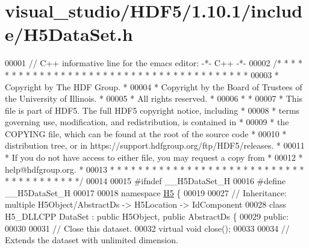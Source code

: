\hypertarget{visual__studio_2_h_d_f5_21_810_81_2include_2_h5_data_set_8h_source}{}\section{visual\+\_\+studio/\+H\+D\+F5/1.10.1/include/\+H5\+Data\+Set.h}
\label{visual__studio_2_h_d_f5_21_810_81_2include_2_h5_data_set_8h_source}

\begin{DoxyCode}
00001 \textcolor{comment}{// C++ informative line for the emacs editor: -*- C++ -*-}
00002 \textcolor{comment}{/* * * * * * * * * * * * * * * * * * * * * * * * * * * * * * * * * * * * * * *}
00003 \textcolor{comment}{ * Copyright by The HDF Group.                                               *}
00004 \textcolor{comment}{ * Copyright by the Board of Trustees of the University of Illinois.         *}
00005 \textcolor{comment}{ * All rights reserved.                                                      *}
00006 \textcolor{comment}{ *                                                                           *}
00007 \textcolor{comment}{ * This file is part of HDF5.  The full HDF5 copyright notice, including     *}
00008 \textcolor{comment}{ * terms governing use, modification, and redistribution, is contained in    *}
00009 \textcolor{comment}{ * the COPYING file, which can be found at the root of the source code       *}
00010 \textcolor{comment}{ * distribution tree, or in https://support.hdfgroup.org/ftp/HDF5/releases.  *}
00011 \textcolor{comment}{ * If you do not have access to either file, you may request a copy from     *}
00012 \textcolor{comment}{ * help@hdfgroup.org.                                                        *}
00013 \textcolor{comment}{ * * * * * * * * * * * * * * * * * * * * * * * * * * * * * * * * * * * * * * */}
00014 
00015 \textcolor{preprocessor}{#ifndef \_\_H5DataSet\_H}
00016 \textcolor{preprocessor}{#define \_\_H5DataSet\_H}
00017 
00018 \textcolor{keyword}{namespace }\hyperlink{namespace_h5}{H5} \{
00019 
00027 \textcolor{comment}{//  Inheritance: multiple H5Object/AbstractDs -> H5Location -> IdComponent}
00028 \textcolor{keyword}{class }H5\_DLLCPP DataSet : \textcolor{keyword}{public} H5Object, \textcolor{keyword}{public} AbstractDs \{
00029    \textcolor{keyword}{public}:
00030 
00031         \textcolor{comment}{// Close this dataset.}
00032         \textcolor{keyword}{virtual} \textcolor{keywordtype}{void} close();
00033 
00034         \textcolor{comment}{// Extends the dataset with unlimited dimension.}

\end{DoxyCode}
